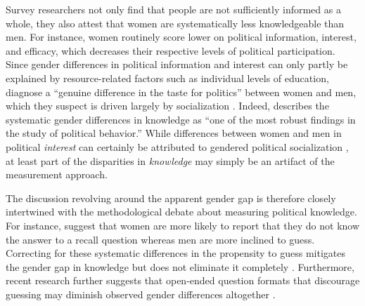 Survey researchers not only find that people are not sufficiently informed as a whole, they also attest that women are systematically less knowledgeable than men. For instance, women routinely score lower on political information, interest, and efficacy, which decreases their respective levels of political participation. Since gender differences in political information and interest can only partly be explained by resource-related factors such as individual levels of education, \citet[1070]{verba1997knowing} diagnose a ``genuine difference in the taste for politics'' between women and men, which they suspect is driven largely by socialization \citep[see also][]{wolak2011roots}. Indeed, \citet[117]{dow2009gender} describes the systematic gender differences in knowledge as ``one of the most robust findings in the study of political behavior.'' While differences between women and men in political \textit{interest} can certainly be attributed to gendered political socialization \citep{bos2021one,wolak2020self}, at least part of the disparities in \textit{knowledge} may simply be an artifact of the measurement approach.

The discussion revolving around the apparent gender gap is therefore closely intertwined with the methodological debate about measuring political knowledge. For instance, \citet{mondak2004knowledge} suggest that women are more likely to report that they do not know the answer to a recall question whereas men are more inclined to guess. Correcting for these systematic differences in the propensity to guess mitigates the gender gap in knowledge but does not eliminate it completely \citep[see also][]{lizotte2009explaining,ferrin2017gender}. Furthermore, recent research further suggests that open-ended question formats that discourage guessing may diminish observed gender differences altogether \citep{ferrin2018simply}.

